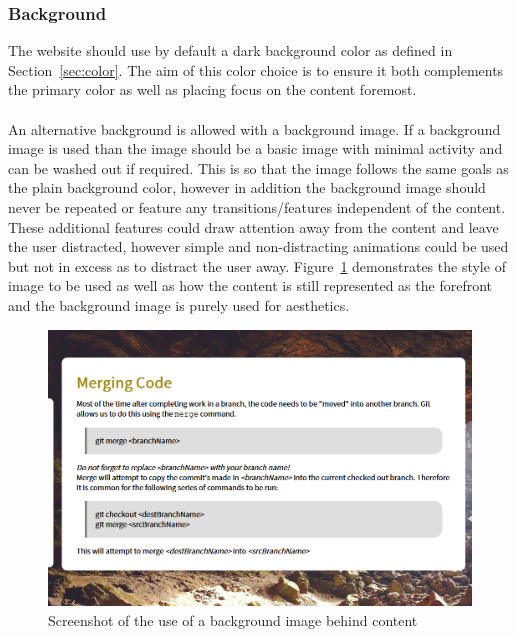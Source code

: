 \subsubsection{Background}
The website should use by default a dark background color as defined in Section~\ref{sec:color}. The aim of this color choice is to ensure it both complements the primary color as well as placing focus on the content foremost.\\\\
An alternative background is allowed with a background image. If a background image is used than the image should be a basic image with minimal activity and can be washed out if required. This is so that the image follows the same goals as the plain background color, however in addition the background image should never be repeated or feature any transitions/features independent of the content. These additional features could draw attention away from the content and leave the user distracted, however simple and non-distracting animations could be used but not in excess as to distract the user away. Figure~\ref{fig:image} demonstrates the style of image to be used as well as how the content is still represented as the forefront and the background image is purely used for aesthetics.

\begin{figure}
	\centering
	\includegraphics[width=0.8\linewidth]{background}
	\caption{Screenshot of the use of a background image behind content}\label{fig:image}
\end{figure}

